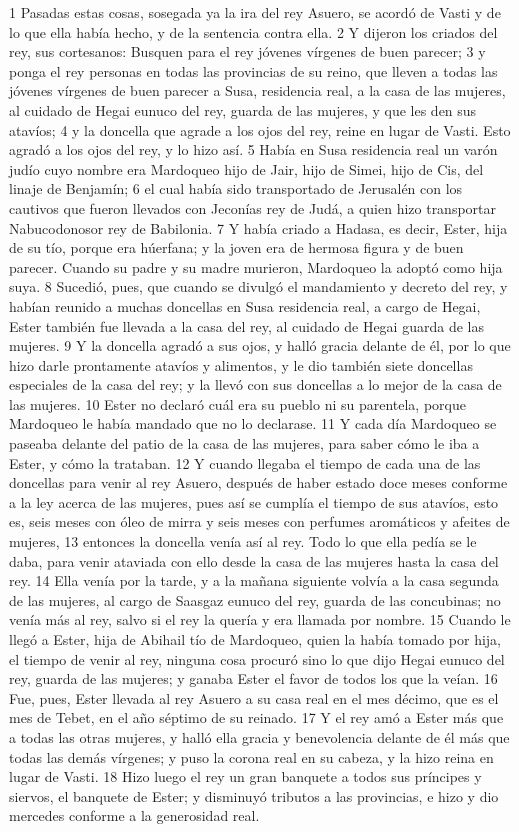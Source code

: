 1 Pasadas estas cosas, sosegada ya la ira del rey Asuero, se acordó de Vasti y de lo que ella había hecho, y de la sentencia contra ella.
2 Y dijeron los criados del rey, sus cortesanos: Busquen para el rey jóvenes vírgenes de buen parecer;
3 y ponga el rey personas en todas las provincias de su reino, que lleven a todas las jóvenes vírgenes de buen parecer a Susa, residencia real, a la casa de las mujeres, al cuidado de Hegai eunuco del rey, guarda de las mujeres, y que les den sus atavíos;
4 y la doncella que agrade a los ojos del rey, reine en lugar de Vasti. Esto agradó a los ojos del rey, y lo hizo así.
5 Había en Susa residencia real un varón judío cuyo nombre era Mardoqueo hijo de Jair, hijo de Simei, hijo de Cis, del linaje de Benjamín;
6 el cual había sido transportado de Jerusalén con los cautivos que fueron llevados con Jeconías rey de Judá, a quien hizo transportar Nabucodonosor rey de Babilonia. 
7 Y había criado a Hadasa, es decir, Ester, hija de su tío, porque era húerfana; y la joven era de hermosa figura y de buen parecer. Cuando su padre y su madre murieron, Mardoqueo la adoptó como hija suya.
8 Sucedió, pues, que cuando se divulgó el mandamiento y decreto del rey, y habían reunido a muchas doncellas en Susa residencia real, a cargo de Hegai, Ester también fue llevada a la casa del rey, al cuidado de Hegai guarda de las mujeres.
9 Y la doncella agradó a sus ojos, y halló gracia delante de él, por lo que hizo darle prontamente atavíos y alimentos, y le dio también siete doncellas especiales de la casa del rey; y la llevó con sus doncellas a lo mejor de la casa de las mujeres. 
10 Ester no declaró cuál era su pueblo ni su parentela, porque Mardoqueo le había mandado que no lo declarase.
11 Y cada día Mardoqueo se paseaba delante del patio de la casa de las mujeres, para saber cómo le iba a Ester, y cómo la trataban.
12 Y cuando llegaba el tiempo de cada una de las doncellas para venir al rey Asuero, después de haber estado doce meses conforme a la ley acerca de las mujeres, pues así se cumplía el tiempo de sus atavíos, esto es, seis meses con óleo de mirra y seis meses con perfumes aromáticos y afeites de mujeres,
13 entonces la doncella venía así al rey. Todo lo que ella pedía se le daba, para venir ataviada con ello desde la casa de las mujeres hasta la casa del rey.
14 Ella venía por la tarde, y a la mañana siguiente volvía a la casa segunda de las mujeres, al cargo de Saasgaz eunuco del rey, guarda de las concubinas; no venía más al rey, salvo si el rey la quería y era llamada por nombre.
15 Cuando le llegó a Ester, hija de Abihail tío de Mardoqueo, quien la había tomado por hija, el tiempo de venir al rey, ninguna cosa procuró sino lo que dijo Hegai eunuco del rey, guarda de las mujeres; y ganaba Ester el favor de todos los que la veían.
16 Fue, pues, Ester llevada al rey Asuero a su casa real en el mes décimo, que es el mes de Tebet, en el año séptimo de su reinado.
17 Y el rey amó a Ester más que a todas las otras mujeres, y halló ella gracia y benevolencia delante de él más que todas las demás vírgenes; y puso la corona real en su cabeza, y la hizo reina en lugar de Vasti.
18 Hizo luego el rey un gran banquete a todos sus príncipes y siervos, el banquete de Ester; y disminuyó tributos a las provincias, e hizo y dio mercedes conforme a la generosidad real.

